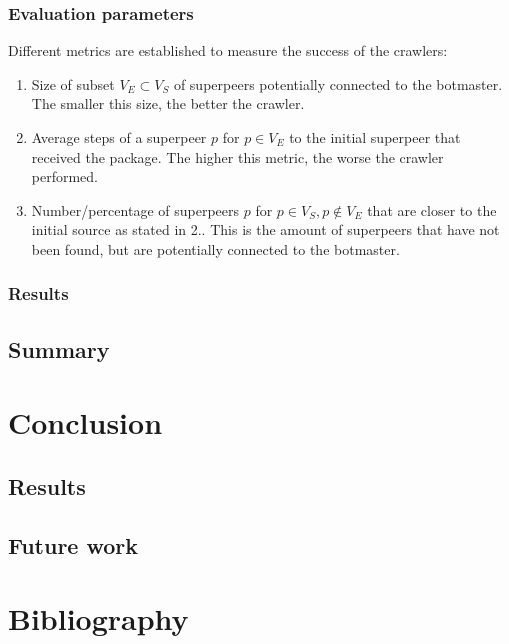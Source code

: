 \documentclass{article}
\begin{document}
\subsubsection{Evaluation parameters}
Different metrics are established to measure the success of the crawlers:

\begin{enumerate}
	\item Size of subset $V_{E} \subset V_{S}$ of superpeers potentially connected to the botmaster. The smaller this size, the better the crawler.
	\item Average steps of a superpeer $p$ for $p \in V_{E}$ to the initial superpeer that received the package. The higher this metric, the worse the crawler performed.
	\item Number/percentage of superpeers $p$ for $p \in V_{S}, p \notin V_{E}$ that are closer to the initial source as stated in 2.. This is the amount of superpeers that have not been found, but are potentially connected to the botmaster.
\end{enumerate}

\subsubsection{Results}

\subsection{Summary}

\section{Conclusion}

\subsection{Results}

\subsection{Future work}

\newpage

\section*{Bibliography}

\nocite{*}


\end{document}
